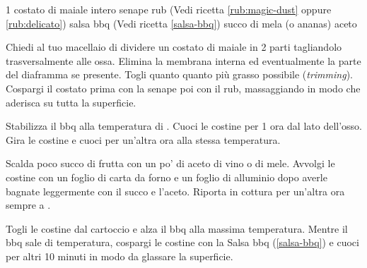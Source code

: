 \label{pork-ribs}
\begin{ingreds}
	1 costato di maiale intero 
	senape 
	rub (Vedi ricetta \ref{rub:magic-dust} oppure \ref{rub:delicato}) 
	salsa bbq (Vedi ricetta \ref{salsa-bbq}) 
	succo di mela (o ananas) 
	aceto

\end{ingreds}

\begin{method}
Chiedi al tuo macellaio di dividere un costato di maiale in 2 parti tagliandolo trasversalmente alle ossa. Elimina la membrana interna ed eventualmente la parte del diaframma se presente. Togli quanto quanto più grasso possibile (\textit{trimming}). Cospargi il costato prima con la senape poi con il rub, massaggiando in modo che aderisca su tutta la superficie.

Stabilizza il bbq alla temperatura di . Cuoci le costine per 1 ora dal lato dell'osso. Gira le costine e cuoci per un'altra ora alla stessa temperatura.

Scalda poco succo di frutta con un po' di aceto di vino o di mele. Avvolgi le costine con un foglio di carta da forno e un foglio di alluminio dopo averle bagnate leggermente con il succo e l'aceto. Riporta in cottura per un'altra ora sempre a .

Togli le costine dal cartoccio e alza il bbq alla massima temperatura. Mentre il bbq sale di temperatura, cospargi le costine con la Salsa bbq (\ref{salsa-bbq}) e cuoci per altri 10 minuti in modo da glassare la superficie.

\end{method}




